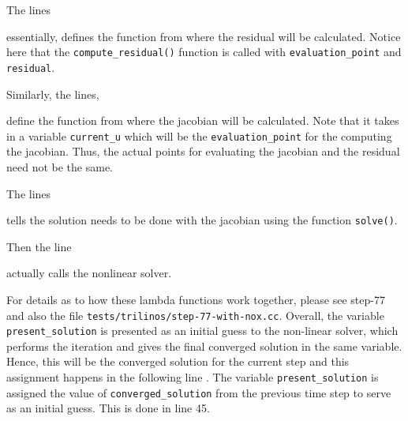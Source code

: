\documentclass[preprint,12pt]{elsarticle}
\newcommand{\te}[1]{\lstinline{#1}}
\numberwithin{equation}{section}
\begin{document}
The lines

essentially, defines the function from where the residual will be calculated. Notice here that the \te{compute_residual()} function is called with \te{evaluation_point} and \te{residual}. 

Similarly, the lines,

define the function from where the jacobian will be calculated. Note that it takes in a variable \te{current_u} which will be the \te{evaluation_point} for the computing the jacobian. Thus, the actual points for evaluating the jacobian and the residual need not be the same. 

The lines

tells the solution needs to be done with the jacobian using the function \te{solve()}. 

Then the line

actually calls the nonlinear solver.

For details as to how these lambda functions work together, please see step-77 and also the file \te{tests/trilinos/step-77-with-nox.cc}. Overall, the variable \te{present_solution} is presented as an initial guess to the non-linear solver, which performs the iteration and gives the final converged solution in the same variable. Hence, this will be the converged solution for the current step and this assignment happens in the following line
. The variable \te{present_solution} is assigned the value of \te{converged_solution} from the previous time step to serve as an initial guess. This is done in line 45. 

\end{document}
